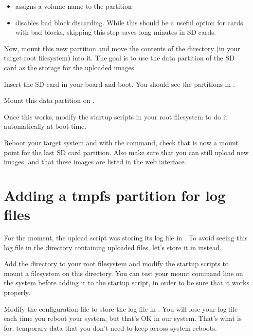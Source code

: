 \begin{itemize}
\item {} assigns a volume name to the partition
\item {} disables bad block discarding. While this
      should be a useful option for cards with bad blocks, skipping
      this step saves long minutes in SD cards.
\end{itemize}

Now, mount this new partition and move the contents of the
 directory (in your target root filesystem) into
it. The goal is to use the data partition of the SD card as the storage
for the uploaded images.

Insert the SD card in your board and boot. You should see the
partitions in .

Mount this data partition on .

Once this works, modify the startup scripts in your root filesystem
to do it automatically at boot time.

Reboot your target system and with the  command, check that
 is now a mount point for the last SD card
partition. Also make sure that you can still upload new images, and
that these images are listed in the web interface.

\section{Adding a tmpfs partition for log files}

For the moment, the upload script was storing its log file in
. To avoid seeing this log file in
the directory containing uploaded files, let's store it in
 instead.

Add the  directory to your root filesystem and modify
the startup scripts to mount a  filesystem on this
directory. You can test your  mount command line on the
system before adding it to the startup script, in order to be sure
that it works properly.

Modify the  configuration file to store
the log file in . You will lose your log
file each time you reboot your system, but that's OK in our
system. That's what  is for: temporary data that you don't need
to keep across system reboots.

